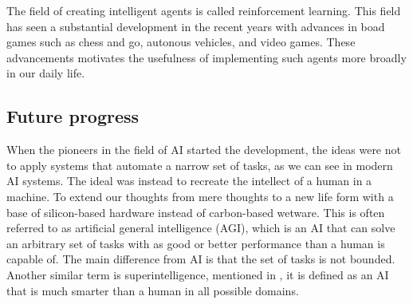 \documentclass[12pt,A4]{report}
\theoremstyle{definition}
\begin{document}
The field of creating intelligent agents is called reinforcement learning. This field has seen a substantial development in the recent years with advances in boad games such as chess and go\autocite{Silver et al.}, autonous vehicles\autocite{Levinson et al.}, and video games\autocite{Minh et al.}. These advancements motivates the usefulness of implementing such agents more broadly in our daily life.



\subsection{Future progress}
When the pioneers in the field of AI started the development, the ideas were not to apply systems that automate a narrow set of tasks, as we can see in modern AI systems. The ideal was instead to recreate the intellect of a human in a machine\autocite{McCarthy et al.}. To extend our thoughts from mere thoughts to a new life form with a base of silicon-based hardware instead of carbon-based wetware. This is often referred to as artificial general intelligence (AGI), which is an AI that can solve an arbitrary set of tasks with as good or better performance than a human is capable of. The main difference from AI is that the set of tasks is not bounded. Another similar term is superintelligence, mentioned in \autocite{Superintelligence}, it is defined as an AI that is much smarter than a human in all possible domains. 
\end{document}

